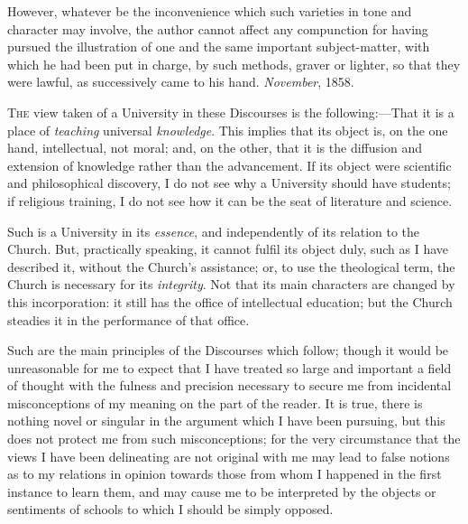 However, whatever be the inconvenience which such varieties in tone
and character may involve, the author cannot affect any compunction for
having pursued the illustration of one and the same important
subject-matter, with which he had been put in charge, by such methods,
graver or lighter, so that they were lawful, as successively came to his
hand.
\emph{November}, 1858.


T\textsc{he} view taken of a University in these Discourses is the
following:—That it is a place of \emph{teaching} universal \emph{knowledge}.
This implies that its object is, on the one hand, intellectual, not
moral; and, on the other, that it is the diffusion and extension of
knowledge rather than the advancement. If its object were scientific and
philosophical discovery, I do not see why a University should have
students; if religious training, I do not see how it can be the seat of
literature and science.

Such is a University in its \emph{essence}, and independently of its
relation to the Church. But, practically speaking, it cannot fulfil its
object duly, such as I have described it, without the Church's
assistance; or, to use the theological term, the Church is necessary for
its \emph{integrity}. Not that its main characters are changed by this
incorporation: it still has the office of intellectual education; but
the Church steadies it in the performance of that office.

Such are the main principles of the Discourses which follow; though
it would be unreasonable for me to expect that I have treated so large
and important a field of thought with the fulness and precision
necessary to secure me from incidental misconceptions of my meaning on
the part of the reader. It is true, there is nothing novel or
singular in the argument which I have been pursuing, but this does not
protect me from such misconceptions; for the very circumstance that the
views I have been delineating are not original with me may lead to false
notions as to my relations in opinion towards those from whom I happened
in the first instance to learn them, and may cause me to be interpreted
by the objects or sentiments of schools to which I should be simply
opposed.

